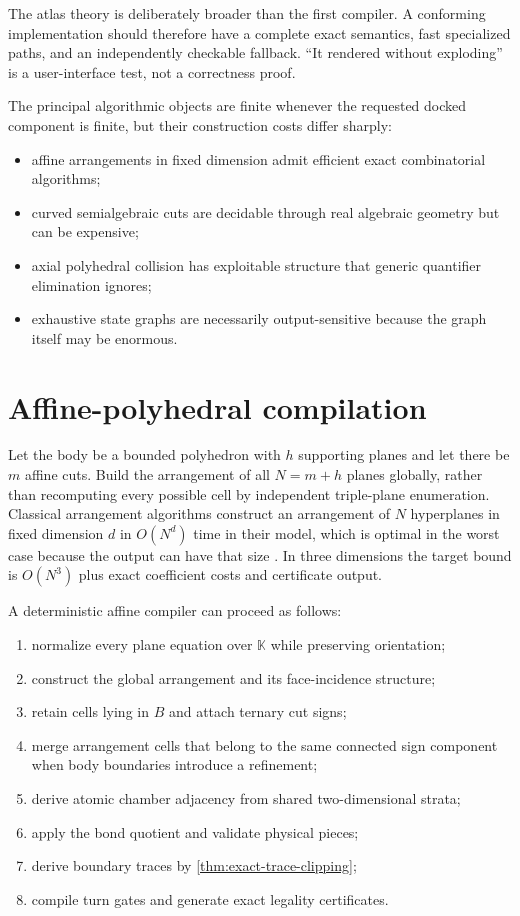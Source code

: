 \documentclass[11pt,openany]{book}
\newcommand{\K}{\mathbb K}
\theoremstyle{polyplain}
\theoremstyle{polydef}
\begin{document}
The atlas theory is deliberately broader than the first compiler. A conforming implementation should therefore have a complete exact semantics, fast specialized paths, and an independently checkable fallback. ``It rendered without exploding'' is a user-interface test, not a correctness proof.

The principal algorithmic objects are finite whenever the requested docked component is finite, but their construction costs differ sharply:
\begin{itemize}
  \item affine arrangements in fixed dimension admit efficient exact combinatorial algorithms;
  \item curved semialgebraic cuts are decidable through real algebraic geometry but can be expensive;
  \item axial polyhedral collision has exploitable structure that generic quantifier elimination ignores;
  \item exhaustive state graphs are necessarily output-sensitive because the graph itself may be enormous.
\end{itemize}

\section{Affine-polyhedral compilation}
\label{sec:exact-algorithms}

Let the body be a bounded polyhedron with $h$ supporting planes and let there be $m$ affine cuts. Build the arrangement of all $N=m+h$ planes globally, rather than recomputing every possible cell by independent triple-plane enumeration. Classical arrangement algorithms construct an arrangement of $N$ hyperplanes in fixed dimension $d$ in $O(N^d)$ time in their model, which is optimal in the worst case because the output can have that size \parencite{EdelsbrunnerORourkeSeidel1986}. In three dimensions the target bound is $O(N^3)$ plus exact coefficient costs and certificate output.

A deterministic affine compiler can proceed as follows:
\begin{enumerate}
  \item normalize every plane equation over $\K$ while preserving orientation;
  \item construct the global arrangement and its face-incidence structure;
  \item retain cells lying in $B$ and attach ternary cut signs;
  \item merge arrangement cells that belong to the same connected sign component when body boundaries introduce a refinement;
  \item derive atomic chamber adjacency from shared two-dimensional strata;
  \item apply the bond quotient and validate physical pieces;
  \item derive boundary traces by \cref{thm:exact-trace-clipping};
  \item compile turn gates and generate exact legality certificates.
\end{enumerate}
\end{document}
